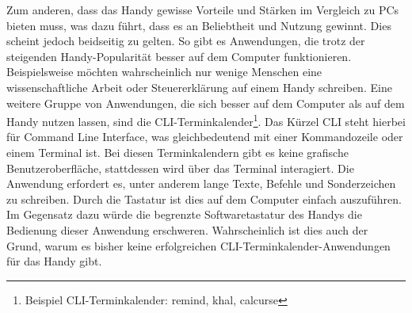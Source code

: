 Zum anderen, dass das Handy gewisse Vorteile und Stärken im Vergleich zu PCs bieten muss, was dazu führt, dass es an Beliebtheit und Nutzung gewinnt. Dies scheint jedoch beidseitig zu gelten. So gibt es Anwendungen, die trotz der steigenden Handy-Popularität besser auf dem Computer funktionieren. Beispielsweise möchten wahrscheinlich nur wenige Menschen eine wissenschaftliche Arbeit oder Steuererklärung auf einem Handy schreiben.%
%
\newline
\myNewSection
Eine weitere Gruppe von Anwendungen, die sich besser auf dem Computer als auf dem Handy nutzen lassen, sind die CLI-Terminkalender\footnote{Beispiel CLI-Terminkalender: remind\cite{cli_remind}, khal\cite{cli_khal}, calcurse\cite{cli_calcurse}}. Das Kürzel \glqq CLI\grqq{} steht hierbei für \glqq Command Line Interface\grqq{}, was gleichbedeutend mit einer Kommandozeile oder einem Terminal ist. Bei diesen Terminkalendern gibt es keine grafische Benutzeroberfläche, stattdessen wird über das Terminal interagiert. Die Anwendung erfordert es, unter anderem lange Texte, Befehle und Sonderzeichen zu schreiben. Durch die Tastatur ist dies auf dem Computer einfach auszuführen. Im Gegensatz dazu würde die begrenzte Softwaretastatur des Handys die Bedienung dieser Anwendung erschweren. Wahrscheinlich ist dies auch der Grund, warum es bisher keine erfolgreichen CLI-Terminkalender-Anwendungen für das Handy gibt.%
%
%
%

